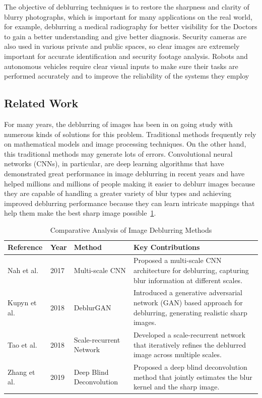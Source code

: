 \documentclass[conference]{IEEEtran}
\begin{document}
The objective of deblurring techniques is to restore the sharpness and clarity of blurry photographs, which is important for many applications on the real world, for example, deblurring a medical radiography for better visibility for the Doctors to gain a better understanding and give better diagnosis.
Security cameras are also used in various private and public spaces, so clear images are extremely important for accurate identification and security footage analysis.
Robots and autonomous vehicles require clear visual inputs to make sure their tasks are performed accurately and to improve the reliability of the systems they employ

\subsection{Related Work}
For many years, the deblurring of images has been in on going study with numerous kinds of solutions for this problem. Traditional methods frequently rely on mathematical models and image processing techniques. On the other hand, this traditional methods may generate lots of errors. Convolutional neural networks (CNNs), in particular, are deep learning algorithms that have demonstrated great performance in image deblurring in recent years and have helped millions and millions of people making it easier to deblurr images because they are capable of handling a greater variety of blur types and achieving improved deblurring performance because they can learn intricate mappings that help them make the best sharp image possible~\ref{tab:ComparativeAnlysis}. 

\begin{table}[!ht]
\centering
\caption{Comparative Analysis of Image Deblurring Methods}
\label{tab:ComparativeAnlysis} 
\begin{tabular}{|l|l|l|p{8cm}|}
\hline
\textbf{Reference} & \textbf{Year} & \textbf{Method} & \textbf{Key Contributions} \\ \hline
Nah et al. & 2017 & Multi-scale CNN & Proposed a multi-scale CNN architecture for deblurring, capturing blur information at different scales. \\ \hline
Kupyn et al. & 2018 & DeblurGAN & Introduced a generative adversarial network (GAN) based approach for deblurring, generating realistic sharp images. \\ \hline
Tao et al. & 2018 & Scale-recurrent Network & Developed a scale-recurrent network that iteratively refines the deblurred image across multiple scales. \\ \hline
Zhang et al. & 2019 & Deep Blind Deconvolution & Proposed a deep blind deconvolution method that jointly estimates the blur kernel and the sharp image. \\ \hline
\end{tabular}
\end{table}
\end{document}

